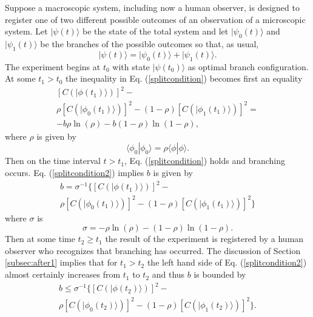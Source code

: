 \documentclass[twocolumn,amsmath,amssymb]{revtex4-1}
\begin{document}
Suppose a macroscopic system, including
now a human observer, is designed
to register one of two different possible outcomes
of an observation of a microscopic system.
Let $|\psi(t) \rangle $ be the state of the total system
and let $|\psi_0(t) \rangle $ and $|\psi_1(t) \rangle $ be the branches
of the possible outcomes so that, as usual,
\begin{equation}
  \label{humanobserver}
  |\psi(t) \rangle  = |\psi_0(t) \rangle  + |\psi_1(t) \rangle .
\end{equation}
The experiment begins at $t_0$ with
state $|\psi(t_0) \rangle $ as optimal branch
configuration.
At some $t_1 > t_0$ the inequality in Eq. (\ref{splitcondition}) becomes
first an equality
\begin{multline}\label{splitcondition2}
  [C( |\phi(t_1) \rangle )]^2 - \\
  \rho [C( |\phi_0(t_1) \rangle )]^2 - ( 1 - \rho) [C( |\phi_1(t_1) \rangle )]^2 = \\
-b \rho \ln( \rho) - b ( 1 - \rho) \ln( 1 - \rho),
\end{multline}
where $\rho$ is given by
\begin{equation}
    \label{defofrho1}
     \langle  \phi_0 | \phi_0 \rangle  = \rho  \langle  \phi | \phi \rangle .
\end{equation}
Then on the time interval $t > t_1$,
Eq. (\ref{splitcondition}) holds 
and branching occurs. 
Eq. (\ref{splitcondition2}) implies $b$ is given by
\begin{multline}
  \label{splitcondition4}
  b = \sigma^{-1} \{  [C( |\phi(t_1) \rangle )]^2 - \\
  \rho [C( |\phi_0(t_1) \rangle )]^2 - ( 1 - \rho) [C( |\phi_1(t_1) \rangle )]^2 \}
\end{multline}
where $\sigma$ is
\begin{equation}
  \label{defsigma}
  \sigma =   -\rho \ln( \rho) - ( 1 - \rho) \ln( 1 - \rho).  
\end{equation}
Then at some time $t_2 \ge t_1$ the result of
the experiment is registered by a human observer
who recognizes that branching has occurred.
The discussion of Section \ref{subsec:after1} 
implies that for $t_1 > t_2$  the left hand side of Eq. (\ref{splitcondition2})
almost certainly increases from $t_1$ to $t_2$ and
thus $b$ is bounded by
\begin{multline}
  \label{splitcondition5}
  b \le \sigma^{-1}  \{ [C( |\phi(t_2) \rangle )]^2 - \\
  \rho [C( |\phi_0(t_2) \rangle )]^2 - ( 1 - \rho) [C( |\phi_1(t_2) \rangle )]^2 \}.
\end{multline}
\end{document}
